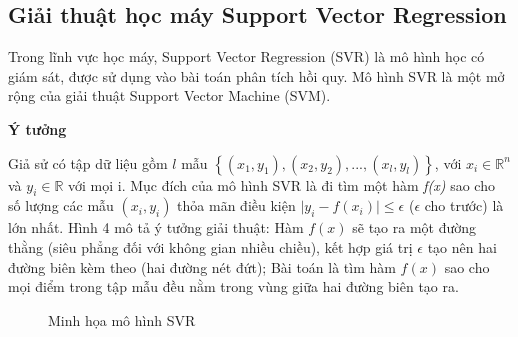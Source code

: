 \documentclass[12pt]{extarticle}
\begin{document}
		\subsection{Giải thuật học máy Support Vector Regression}
			\par Trong lĩnh vực học máy, Support Vector Regression (SVR) là mô hình học có giám sát, được sử dụng vào bài toán phân tích hồi quy. Mô hình SVR là một mở rộng của giải thuật Support Vector Machine (SVM).
			\par \textbf{Ý tưởng}
				\par Giả sử có tập dữ liệu gồm $l$ mẫu $\left\{\left(x_{1},y_{1}\right),\left(x_{2},y_{2}\right),...,\left(x_{l},y_{l}\right)\right\}$, với $x_{i}\in  \mathbb{R}^{n}$ và $y_{i}\in  \mathbb{R}$ với mọi i. Mục đích của mô hình SVR là đi tìm một hàm \textit{f(x)} sao cho số lượng các mẫu $\left(x_{i},y_{i}\right)$ thỏa mãn điều kiện $\mid y_{i} - f(x_{i})\mid \leq \epsilon $ ($\epsilon$ cho trước) là lớn nhất. Hình 4 mô tả ý tưởng giải thuật: Hàm $f(x)$ sẽ tạo ra một đường thằng (siêu phẳng đối với không gian nhiều chiều), kết hợp giá trị $\epsilon$ tạo nên hai đường biên kèm theo (hai đường nét đứt); Bài toán là tìm hàm $f(x)$ sao cho mọi điểm trong tập mẫu đều nằm trong vùng giữa hai đường biên tạo ra.
				\begin{figure}[h!]
				\begin{center}
				\end{center}
					\caption{Minh họa mô hình SVR}
				\label{fig:foody}
			\end{figure}
\end{document}

